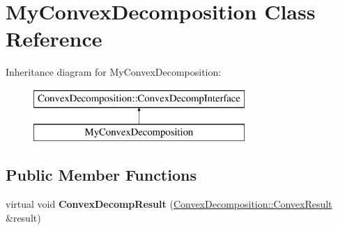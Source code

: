 \hypertarget{class_my_convex_decomposition}{\section{My\-Convex\-Decomposition Class Reference}
\label{class_my_convex_decomposition}
}
Inheritance diagram for My\-Convex\-Decomposition\-:\begin{figure}[H]
\begin{center}
\leavevmode
\includegraphics[height=2.000000cm]{class_my_convex_decomposition}
\end{center}
\end{figure}
\subsection*{Public Member Functions}
\begin{DoxyCompactItemize}
\item 
\hypertarget{class_my_convex_decomposition_a3abbe41135a655ce5be0fc8162dd742b}{virtual void {\bfseries Convex\-Decomp\-Result} (\hyperlink{class_convex_decomposition_1_1_convex_result}{Convex\-Decomposition\-::\-Convex\-Result} \&result)}\label{class_my_convex_decomposition_a3abbe41135a655ce5be0fc8162dd742b}

\end{DoxyCompactItemize}
